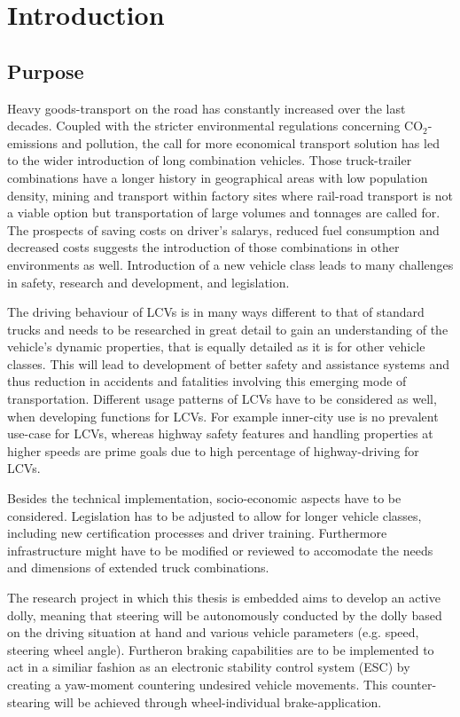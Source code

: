 \documentclass[ExampleMasters.tex]{subfiles}
\begin{document}
\clearpage	
\chapter{Introduction}
\label{chap:introduction}

\section{Purpose}
\label{sec:purpose}
Heavy goods-transport on the road has constantly increased over the last decades. Coupled with the stricter environmental regulations concerning CO$_{2}$-emissions and pollution, the call for more economical transport solution has led to the wider introduction of long combination vehicles. Those truck-trailer combinations have a longer history in geographical areas with low population density, mining and transport within factory sites where rail-road transport is not a viable option but transportation of large volumes and tonnages are called for. The prospects of saving costs on driver's salarys, reduced fuel consumption and decreased costs suggests the introduction of those combinations in other environments as well. Introduction of a new vehicle class leads to many challenges in safety, research and development, and legislation. 

The driving behaviour of LCVs is in many ways different to that of standard trucks and needs to be researched in great detail to gain an understanding of the vehicle's dynamic properties, that is equally detailed as it is for other vehicle classes. This will lead to development of better safety and assistance systems and thus reduction in accidents and fatalities involving this emerging mode of transportation. Different usage patterns of LCVs have to be considered as well, when developing functions for LCVs. For example inner-city use is no prevalent use-case for LCVs, whereas highway safety features and handling properties at higher speeds are prime goals due to high percentage of highway-driving for LCVs.

Besides the technical implementation, socio-economic aspects have to be considered. Legislation has to be adjusted to allow for longer vehicle classes, including new certification processes and driver training. Furthermore infrastructure might have to be modified or reviewed to accomodate the needs and dimensions of extended truck combinations.

The research project in which this thesis is embedded aims to develop an active dolly, meaning that steering will be autonomously conducted by the dolly based on the driving situation at hand and various vehicle parameters (e.g. speed, steering wheel angle). Furtheron braking capabilities are to be implemented to act in a similiar fashion as an electronic stability control system (ESC) by creating a yaw-moment countering undesired vehicle movements. This counter-stearing will be achieved through wheel-individual brake-application. 
\end{document}
